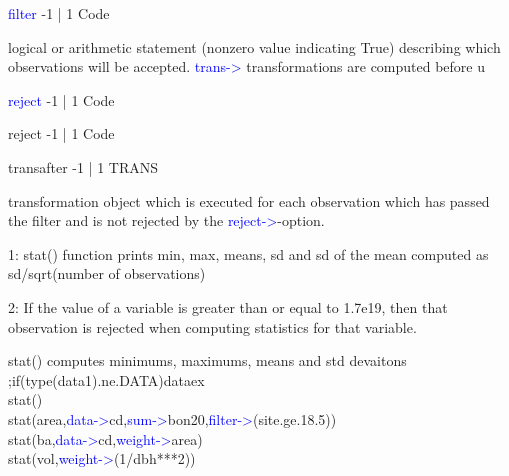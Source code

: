 \vspace{0.3cm}
\hline
\vspace{0.3cm}
\noindent \textcolor{blue}{filter}  \tabto{3cm} -1 | 1 \tabto{5cm}  Code \tabto{7cm}
\begin{changemargin}{3cm}{0cm}
\noindent  logical or arithmetic statement (nonzero value indicating True) describing which observations will be accepted. \textcolor{blue}{trans->} transformations are computed before u
\end{changemargin}
\vspace{0.3cm}
\hline
\vspace{0.3cm}
\noindent \textcolor{blue}{reject}  \tabto{3cm} -1 | 1 \tabto{5cm}  Code \tabto{7cm}
\begin{changemargin}{3cm}{0cm}
\noindent \noindent reject  \tabto{3cm} -1 | 1 \tabto{5cm}  Code \tabto{7cm}
\end{changemargin}
\vspace{0.3cm}
\hline
\vspace{0.3cm}
\noindent transafter  \tabto{3cm} -1 | 1 \tabto{5cm}   TRANS \tabto{7cm}
\begin{changemargin}{3cm}{0cm}
\noindent  transformation object which is executed for each observation which has passed the filter and is not rejected by the \textcolor{blue}{reject->}-option.
\end {changemargin}
\hline
\vspace{0.2cm}
\begin{note}
1: \textcolor{VioletRed}{stat}() function prints min, max, means, sd and sd of the mean computed
as sd/\textcolor{VioletRed}{sqrt}(number of observations)
\end{note}
\begin{note}
2: If the value of a variable is greater than or equal to 1.7e19,
then that observation is rejected when computing statistics for that variable.
\end{note}
\begin{example}[statex]stat() computes minimums, maximums, means and std devaitons\\
\label{statex}
;if(\textcolor{VioletRed}{type}(data1).ne.DATA)dataex\\
\textcolor{VioletRed}{stat}()\\
\textcolor{VioletRed}{stat}(area,\textcolor{blue}{data->}cd,\textcolor{blue}{sum->}bon20,\textcolor{blue}{filter->}(site.ge.18.5))\\
\textcolor{VioletRed}{stat}(ba,\textcolor{blue}{data->}cd,\textcolor{blue}{weight->}area)\\
\textcolor{VioletRed}{stat}(vol,\textcolor{blue}{weight->}(1/dbh***2))
\end{example}
